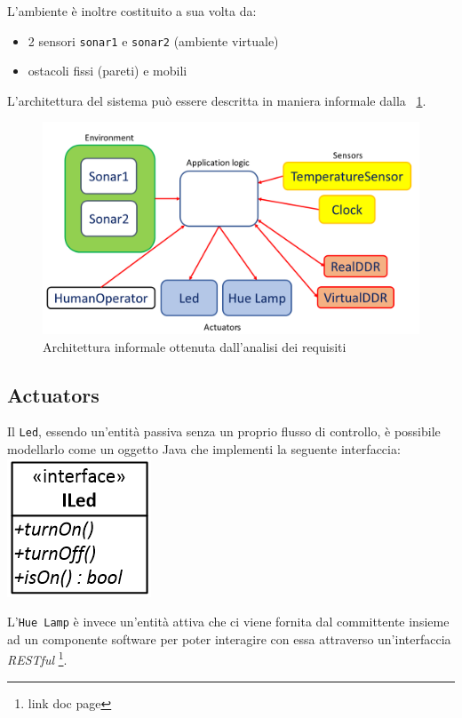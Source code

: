 \documentclass{../llncs}
\newcommand{\code}[1]{{\color{blue}\small{\texttt{#1}}}}
\newcommand{\labelfig}[1]{\label{fig:#1}}
\newcommand{\xf}[1]{\figurename~\ref{fig:#1}}
\begin{document}
L'ambiente è inoltre costituito a sua volta da:
\begin{itemize}[label={--}]
\item 2 sensori \code{sonar1} e \code{sonar2} (ambiente virtuale)
\item ostacoli fissi (pareti) e mobili
\end{itemize}

L'architettura del sistema può essere descritta in maniera informale dalla \xf{informalRA}.
\begin{figure}[!htb]
\centering
\includegraphics[scale=0.4]{img/informalReqAnalysis.png}
\caption{Architettura informale ottenuta dall'analisi dei requisiti}\labelfig{informalRA}
\end{figure}

\subsection{Actuators}
Il \texttt{Led}, essendo un'entità passiva senza un proprio flusso di controllo, è possibile modellarlo come un oggetto Java che implementi la seguente interfaccia:\\

\includegraphics[scale=0.4]{img/iled.png}

L'\texttt{Hue Lamp} è invece un'entità attiva che ci viene fornita dal committente insieme ad un componente software per poter interagire con essa attraverso un'interfaccia \textit{RESTful}
\footnote{link doc page}.
\end{document}
